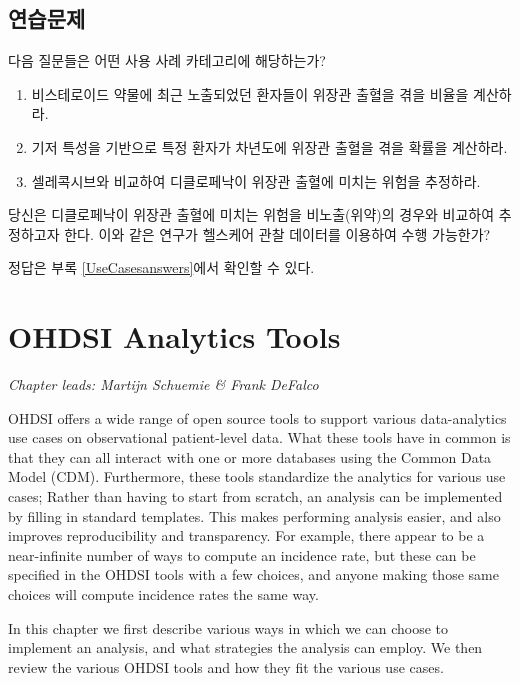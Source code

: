 \documentclass[11pt]{book}
\theoremstyle{definition}
\theoremstyle{definition}
\theoremstyle{definition}
\theoremstyle{remark}
\let\BeginKnitrBlock\begin \let\EndKnitrBlock\end
\begin{document}
\section{연습문제}

\BeginKnitrBlock{exercise}
\protect\hypertarget{exr:exerciseUseCases1}{}{\label{exr:exerciseUseCases1}
}다음 질문들은 어떤 사용 사례 카테고리에 해당하는가?

\begin{enumerate}
\def\labelenumi{\arabic{enumi}.}
\item
  비스테로이드 약물에 최근 노출되었던 환자들이 위장관 출혈을 겪을 비율을
  계산하라.
\item
  기저 특성을 기반으로 특정 환자가 차년도에 위장관 출혈을 겪을 확률을
  계산하라.
\item
  셀레콕시브와 비교하여 디클로페낙이 위장관 출혈에 미치는 위험을
  추정하라.
\end{enumerate}
\EndKnitrBlock{exercise}

\BeginKnitrBlock{exercise}
\protect\hypertarget{exr:exerciseUseCases2}{}{\label{exr:exerciseUseCases2}
}당신은 디클로페낙이 위장관 출혈에 미치는 위험을 비노출(위약)의 경우와
비교하여 추정하고자 한다. 이와 같은 연구가 헬스케어 관찰 데이터를
이용하여 수행 가능한가?
\EndKnitrBlock{exercise}

정답은 부록 \ref{UseCasesanswers}에서 확인할 수 있다.

\chapter{OHDSI Analytics Tools}\label{OhdsiAnalyticsTools}

\emph{Chapter leads: Martijn Schuemie \& Frank DeFalco}

OHDSI offers a wide range of open source tools to support various
data-analytics use cases on observational patient-level data. What these
tools have in common is that they can all interact with one or more
databases using the Common Data Model (CDM). Furthermore, these tools
standardize the analytics for various use cases; Rather than having to
start from scratch, an analysis can be implemented by filling in
standard templates. This makes performing analysis easier, and also
improves reproducibility and transparency. For example, there appear to
be a near-infinite number of ways to compute an incidence rate, but
these can be specified in the OHDSI tools with a few choices, and anyone
making those same choices will compute incidence rates the same way.

In this chapter we first describe various ways in which we can choose to
implement an analysis, and what strategies the analysis can employ. We
then review the various OHDSI tools and how they fit the various use
cases.
\end{document}

